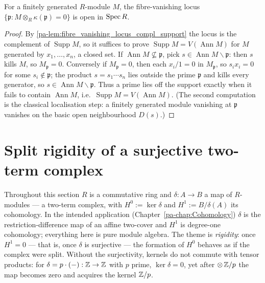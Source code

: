 \begin{theorem}
  \label{pa-thm:isOpen_fibre_vanishing}
  \leanok

  For a finitely generated \(R\)-module \(M\), the fibre-vanishing locus
  \(\{\mathfrak p : M \otimes_R \kappa(\mathfrak p) = 0\}\) is open in \(\operatorname{Spec} R\).
\end{theorem}
\begin{proof}
  \leanok
  By \ref{pa-lem:fibre_vanishing_locus_compl_support} the locus is the complement of
  \(\operatorname{Supp} M\), so it suffices to prove
  \(\operatorname{Supp} M = V(\operatorname{Ann} M)\) for \(M\) generated by
  \(x_1, \dots, x_n\), a closed set. If
  \(\operatorname{Ann} M \not\subseteq \mathfrak p\), pick
  \(s \in \operatorname{Ann} M \smallsetminus \mathfrak p\): then \(s\) kills \(M\), so
  \(M_{\mathfrak p} = 0\). Conversely if \(M_{\mathfrak p} = 0\), then each
  \(x_i/1 = 0\) in \(M_{\mathfrak p}\), so \(s_i x_i = 0\) for some
  \(s_i \notin \mathfrak p\); the product \(s = s_1 \cdots s_n\) lies outside the prime
  \(\mathfrak p\) and kills every generator, so
  \(s \in \operatorname{Ann} M \smallsetminus \mathfrak p\). Thus a prime lies off the
  support exactly when it fails to contain \(\operatorname{Ann} M\), i.e.\
  \(\operatorname{Supp} M = V(\operatorname{Ann} M)\). (The second computation is the
  classical localisation step: a finitely generated module vanishing at \(\mathfrak p\)
  vanishes on the basic open neighbourhood \(D(s)\).)
\end{proof}

\section{Split rigidity of a surjective two-term complex}
\label{pa-sec:split_rigidity}

Throughout this section \(R\) is a commutative ring and \(\delta : A \to B\) a map of
\(R\)-modules --- a two-term complex, with
\(H^0 := \ker \delta\) and \(H^1 := B/\delta(A)\) its cohomology. In the intended
application (Chapter~\ref{pa-chap:Cohomology}) \(\delta\) is the restriction-difference map
of an affine two-cover and \(H^1\) is degree-one cohomology; everything here is pure
module algebra. The theme is \emph{rigidity}: once \(H^1 = 0\) --- that is, once
\(\delta\) is surjective --- the formation of \(H^0\) behaves as if the complex were
split. Without the surjectivity, kernels do not commute with tensor products: for
\(\delta = p \cdot (-) : \mathbb{Z} \to \mathbb{Z}\) with \(p\) prime, \(\ker \delta = 0\), yet after
\(\otimes\, \mathbb{Z}/p\) the map becomes zero and acquires the kernel \(\mathbb{Z}/p\).

